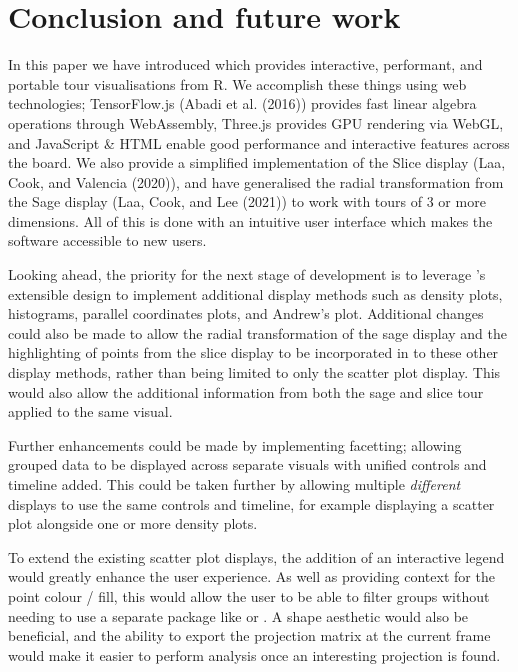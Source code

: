 \hypertarget{conclusion-and-future-work}{%
\section{Conclusion and future work}\label{conclusion-and-future-work}}

In this paper we have introduced  which provides interactive, performant, and portable tour visualisations from R. We accomplish these things using web technologies; TensorFlow.js (Abadi et al. (2016)) provides fast linear algebra operations through WebAssembly, Three.js provides GPU rendering via WebGL, and JavaScript \& HTML enable good performance and interactive features across the board. We also provide a simplified implementation of the Slice display (Laa, Cook, and Valencia (2020)), and have generalised the radial transformation from the Sage display (Laa, Cook, and Lee (2021)) to work with tours of 3 or more dimensions. All of this is done with an intuitive user interface which makes the software accessible to new users.

Looking ahead, the priority for the next stage of development is to leverage 's extensible design to implement additional display methods such as density plots, histograms, parallel coordinates plots, and Andrew's plot. Additional changes could also be made to allow the radial transformation of the sage display and the highlighting of points from the slice display to be incorporated in to these other display methods, rather than being limited to only the scatter plot display. This would also allow the additional information from both the sage and slice tour applied to the same visual.

Further enhancements could be made by implementing facetting; allowing grouped data to be displayed across separate visuals with unified controls and timeline added. This could be taken further by allowing multiple \emph{different} displays to use the same controls and timeline, for example displaying a scatter plot alongside one or more density plots.

To extend the existing scatter plot displays, the addition of an interactive legend would greatly enhance the user experience. As well as providing context for the point colour / fill, this would allow the user to be able to filter groups without needing to use a separate package like  or . A shape aesthetic would also be beneficial, and the ability to export the projection matrix at the current frame would make it easier to perform analysis once an interesting projection is found.

